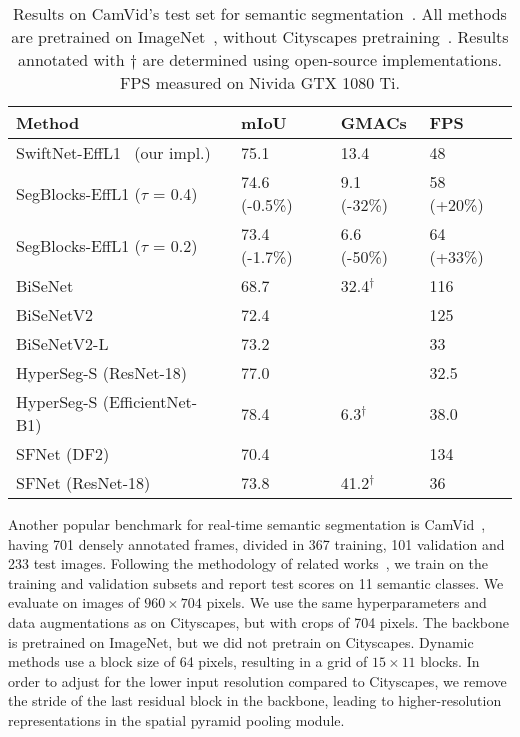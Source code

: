 \begin{table}[t]
\scriptsize
\centering
\caption{{Results on CamVid's test set for semantic segmentation~\cite{brostow2009semantic_camvid}. All methods are pretrained on ImageNet~\cite{deng_imagenet_2009}, without Cityscapes pretraining~\cite{cordts_cityscapes_2016}. Results annotated with $\dag$  are determined using open-source implementations. FPS measured on Nivida GTX 1080 Ti.  }}\label{tab:results_camvid}
\begin{tabular}{@{}llll@{}}
\toprule
\textbf{Method}              & \textbf{mIoU} & \textbf{GMACs} & \textbf{FPS}                    \\  \midrule
SwiftNet-EffL1~\cite{orsic_defense_2019} (our impl.)    & 75.1          & 13.4           & 48                  \\
SegBlocks-EffL1 ($\tau$ = 0.4)& 74.6  (-0.5\%)& 9.1 (-32\%) & 58  (+20\%) \\
SegBlocks-EffL1 ($\tau$ = 0.2)& 73.4  (-1.7\%)& 6.6 (-50\%) & 64  (+33\%) \\
\midrule

BiSeNet~\cite{ferrari_bisenet_2018}                     & 68.7          &  32.4$^{\dag}$          & 116                  \\
BiSeNetV2~\cite{yu2021bisenet}                    & 72.4          &                & 125                       \\
BiSeNetV2-L~\cite{yu2021bisenet}                  & 73.2          &                & 33                        \\
HyperSeg-S (ResNet-18)~\cite{nirkin2021hyperseg}   & 77.0          &                & 32.5          \\
HyperSeg-S (EfficientNet-B1)~\cite{nirkin2021hyperseg}   & 78.4        &  6.3$^{\dag}$       & 38.0            \\
SFNet (DF2)~\cite{li2020semantic}                  & 70.4          &                & 134                      \\
SFNet (ResNet-18)~\cite{li2020semantic}            & 73.8          &   41.2$^{\dag}$         & 36                      \\                 \bottomrule
\end{tabular}
\end{table}

Another popular benchmark for real-time semantic segmentation is CamVid~\cite{brostow2009semantic_camvid}, having 701 densely annotated frames, divided in 367 training, 101 validation and 233 test images. Following the methodology of related works~\cite{ferrari_bisenet_2018, orsic_defense_2019, yu2021bisenet}, we train on the training and validation subsets and report test scores on 11 semantic classes. We evaluate on images of $960{\times}704$ pixels. We use the same hyperparameters and data augmentations as on Cityscapes, but with crops of 704 pixels. The backbone is pretrained on ImageNet, but we did not pretrain on Cityscapes.
Dynamic methods use a block size of 64 pixels, resulting in a grid of $15{\times}11$ blocks. In order to adjust for the lower input resolution compared to Cityscapes, we remove the stride of the last residual block in the backbone, leading to higher-resolution representations in the spatial pyramid pooling module.

